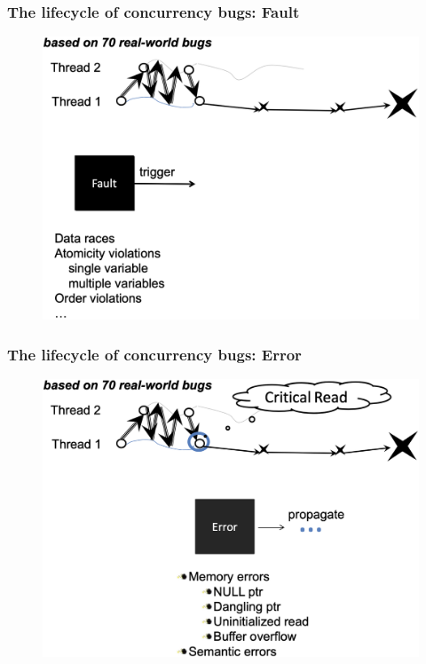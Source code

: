% 
% 
% 
% 
\begin{frame}[fragile]
    \frametitle{The lifecycle of concurrency bugs: Fault}
    \begin{figure}
    \includegraphics[width=0.62\linewidth]{figs/fault.png}
    \end{figure}
\end{frame}
% 
% 
\begin{frame}[fragile]
    \frametitle{The lifecycle of concurrency bugs: Error}
    \begin{figure}
    \includegraphics[width=0.6\linewidth]{figs/error.png}
    \end{figure}
\end{frame}
% 
